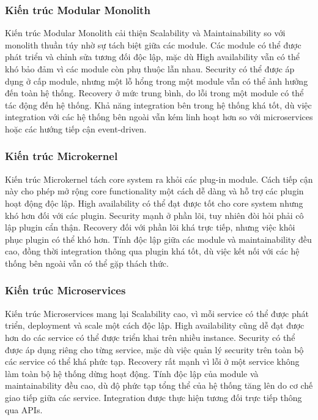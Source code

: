 \subsubsection{Kiến trúc Modular Monolith}
Kiến trúc Modular Monolith cải thiện Scalability và Maintainability so với monolith thuần túy nhờ sự tách biệt giữa các module. Các module có thể được phát triển và chỉnh sửa tương đối độc lập, mặc dù High availability vẫn có thể khó bảo đảm vì các module còn phụ thuộc lẫn nhau. Security có thể được áp dụng ở cấp module, nhưng một lỗ hổng trong một module vẫn có thể ảnh hưởng đến toàn hệ thống. Recovery ở mức trung bình, do lỗi trong một module có thể tác động đến hệ thống. Khả năng integration bên trong hệ thống khá tốt, dù việc integration với các hệ thống bên ngoài vẫn kém linh hoạt hơn so với microservices hoặc các hướng tiếp cận event-driven.

\subsubsection{Kiến trúc Microkernel}
Kiến trúc Microkernel tách core system ra khỏi các plug-in module. Cách tiếp cận này cho phép mở rộng core functionality một cách dễ dàng và hỗ trợ các plugin hoạt động độc lập. High availability có thể đạt được tốt cho core system nhưng khó hơn đối với các plugin. Security mạnh ở phần lõi, tuy nhiên đòi hỏi phải cô lập plugin cẩn thận. Recovery đối với phần lõi khá trực tiếp, nhưng việc khôi phục plugin có thể khó hơn. Tính độc lập giữa các module và maintainability đều cao, đồng thời integration thông qua plugin khá tốt, dù việc kết nối với các hệ thống bên ngoài vẫn có thể gặp thách thức.

\subsubsection{Kiến trúc Microservices}
Kiến trúc Microservices mang lại Scalability cao, vì mỗi service có thể được phát triển, deployment và scale một cách độc lập. High availability cũng dễ đạt được hơn do các service có thể được triển khai trên nhiều instance. Security có thể được áp dụng riêng cho từng service, mặc dù việc quản lý security trên toàn bộ các service có thể khá phức tạp. Recovery rất mạnh vì lỗi ở một service không làm toàn bộ hệ thống dừng hoạt động. Tính độc lập của module và maintainability đều cao, dù độ phức tạp tổng thể của hệ thống tăng lên do cơ chế giao tiếp giữa các service. Integration được thực hiện tương đối trực tiếp thông qua APIs.

